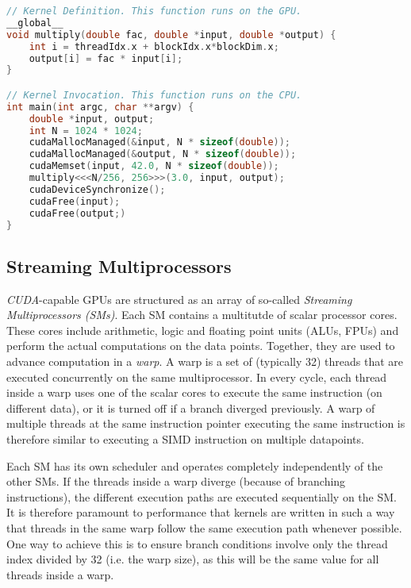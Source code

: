 \begin{lstfloat}
\begin{lstlisting}[caption={Example showing kernel, its launch and CUDA API calls for allocating unified memory},captionpos=b,language=C]
// Kernel Definition. This function runs on the GPU.
__global__
void multiply(double fac, double *input, double *output) {
	int i = threadIdx.x + blockIdx.x*blockDim.x;
	output[i] = fac * input[i];
}

// Kernel Invocation. This function runs on the CPU.
int main(int argc, char **argv) {
	double *input, output;
	int N = 1024 * 1024;
	cudaMallocManaged(&input, N * sizeof(double));
	cudaMallocManaged(&output, N * sizeof(double));
	cudaMemset(input, 42.0, N * sizeof(double));
	multiply<<<N/256, 256>>>(3.0, input, output);
	cudaDeviceSynchronize();
	cudaFree(input);
	cudaFree(output;)
}
\end{lstlisting}
\end{lstfloat}

\subsection{Streaming Multiprocessors} \label{sec:hardware}

\emph{CUDA}-capable GPUs are structured as an array of so-called \emph{Streaming Multiprocessors (SMs)}. Each SM contains a multitutde of scalar processor cores. These cores include arithmetic, logic and floating point units (ALUs, FPUs) and perform the actual computations on the data points. Together, they are used to advance computation in a \emph{warp}. A warp is a set of (typically 32) threads that are executed concurrently on the same multiprocessor. In every cycle, each thread inside a warp uses one of the scalar cores to execute the same instruction (on different data), or it is turned off if a branch diverged previously. A warp of multiple threads at the same instruction pointer executing the same instruction is therefore similar to executing a SIMD instruction on multiple datapoints.

Each SM has its own scheduler and operates completely independently of the other SMs. If the threads inside a warp diverge (because of branching instructions), the different execution paths are executed sequentially on the SM. It is therefore paramount to performance that kernels are written in such a way that threads in the same warp follow the same execution path whenever possible. One way to achieve this is to ensure branch conditions involve only the thread index divided by 32 (i.e. the warp size), as this will be the same value for all threads inside a warp. 

